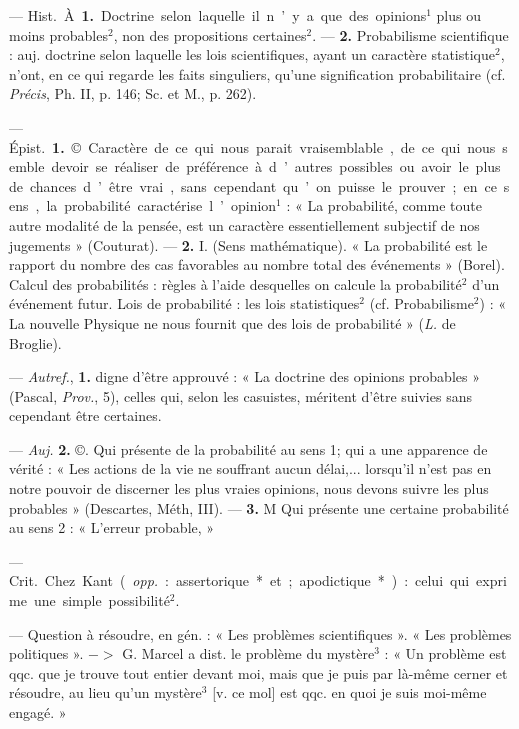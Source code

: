 \begin{itemize}[leftmargin=1cm, label=, itemsep=1pt]
 — \si{Hist.} À. {\bf 1.} Doctrine
selon laquelle il n’y a que des opinions$^1$ plus ou moins probables$^2$, non
des propositions certaines$^2$. — {\bf 2.}
Probabilisme scientifique : auj. doctrine selon laquelle les lois scientifiques, ayant un caractère statistique$^2$, n’ont, en ce qui regarde les
faits singuliers, qu'une signification probabilitaire (cf. {\it Précis}, Ph. II,
p. 146; Sc. et M., p. 262).

 — \si{Épist.} {\bf 1.} ©. Caractère
de ce qui nous parait vraisemblable,
de ce qui nous semble devoir se
réaliser de préférence à d’autres
possibles ou avoir le plus de chances
d’être vrai, sans cependant qu’on
puisse le prouver; en ce sens, la
probabilité caractérise l’opinion$^1$ :
« La probabilité, comme toute autre
modalité de la pensée, est un caractère essentiellement subjectif de nos
jugements » (Couturat). — {\bf 2.} I.
(Sens mathématique). « La probabilité est le rapport du nombre des
cas favorables au nombre total des
événements » (Borel). Calcul des
probabilités : règles à l'aide desquelles on calcule la probabilité$^2$
d’un événement futur. Lois de probabilité : les lois statistiques$^2$ (cf.
Probabilisme$^2$) : « La nouvelle Physique ne nous fournit que des lois de
probabilité » ({\it L.} de Broglie).

 — {\it Autref.}, {\bf 1.} digne d'être
approuvé : « La doctrine des opinions probables » (Pascal, {\it Prov.}, 5),
celles qui, selon les casuistes, méritent d’être suivies sans cependant
être certaines.

— {\it Auj.} {\bf 2.} ©. Qui présente de la
probabilité au sens 1; qui a une
apparence de vérité : « Les actions
de la vie ne souffrant aucun délai,...
lorsqu'il n’est pas en notre pouvoir
de discerner les plus vraies opinions,
nous devons suivre les plus probables » (Descartes, Méth, III). —
 {\bf 3.} M Qui présente une certaine probabilité au sens 2 : « L'erreur probable, »

 — \si{Crit.}
Chez Kant ({\it opp.} : assertorique* et ;
apodictique*) : celui qui exprime une
simple possibilité$^2$.

 — Question à résoudre, en
gén. : « Les problèmes scientifiques ».
« Les problèmes politiques ». $->$
G. Marcel a dist. le problème du
mystère$^3$ : « Un problème est qqc. que
je trouve tout entier devant moi,
mais que je puis par là-même cerner
et résoudre, au lieu qu’un mystère$^3$
[v. ce mol] est qqc. en quoi je suis
moi-même engagé. »


\end{itemize}
